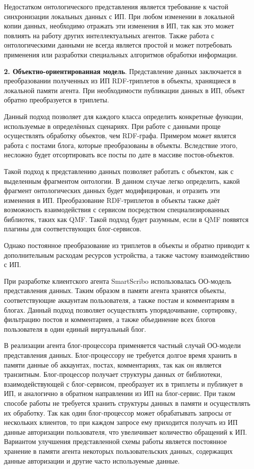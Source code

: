 Недостатком онтологического представления является требование к частой синхронизации локальных данных с ИП. При любом изменении в локальной копии данных, необходимо отражать эти изменения в ИП, так как это может повлиять на работу других интеллектуальных агентов. Также работа с онтологическими данными не всегда является простой и может потребовать применения или разработки специальных алгоритмов обработки информации.

{\bf 2. Объектно-ориентированная модель}.
Представление данных заключается в преобразовании полученных из ИП RDF-триплетов в объекты, хранящиеся в локальной памяти агента. При необходимости публикации данных в ИП, объект обратно преобразуется в триплеты.

Данный подход позволяет для каждого класса определить конкретные функции, используемые в определённых сценариях. При работе с данными проще осуществлять обработку объектов, чем RDF-графа. Примером может являтся работа с постами блога, которые преобразованы в объекты. Вследствие этого, несложно будет отсортировать все посты по дате в массиве постов-объектов.

Такой подход к представлению данных позволяет работать с объектом, как с выделенным фрагментом онтологии. В данном случае легко определить, какой фрагмент онтологических данных будет модифицирован, и отразить эти изменения в ИП. Преобразование RDF-триплетов в объекты также даёт возможность взаимодействия с сервисом посредством специализированных библиотек, таких как QMF. Такой подход будет разумным, если в QMF появятся плагины для соответствующих блог-сервисов.

Однако постоянное преобразование из триплетов в объекты и обратно приводит к дополнительным расходам ресурсов устройства, а также частому взаимодействию с ИП.

\vspace{0,5cm}

При разработке клиентского агента SmartScribo использовалась ОО-модель представления данных. Таким образом в памяти агента хранятся объекты, соответствующие аккаунтам пользователя, а также постам и комментариям в блогах. Данный подход позволяет осуществлять упорядочивание, сортировку, фильтрацию постов и комментариев, а также объединение всех блогов пользователя в один единый виртуальный блог.

В реализации агента блог-процессора применяется частный случай ОО-модели представления данных. Блог-процессору не требуется долгое время хранить в памяти данные об аккаунтах, постах, комментариях, так как он является транзитным. Блог-процессор получает структуры данных от библиотеки, взаимодействующей с блог-сервисом, преобразует их в триплеты и публикует в ИП, и аналогично в обратном направлении из ИП на блог-сервис. При таком способе работы не требуется хранить структуры данных в памяти и осуществлять их обработку. Так как один блог-процессор может обрабатывать запросы от нескольких клиентов, то при каждом запросе ему приходится получать из ИП данные авторизации пользователя, что увеличивает количество обращений к ИП. Вариантом улучшения представленной схемы работы является постоянное хранение в памяти агента некоторых пользовательских данных, содержащих данные авторизации и другие часто используемые данные.

